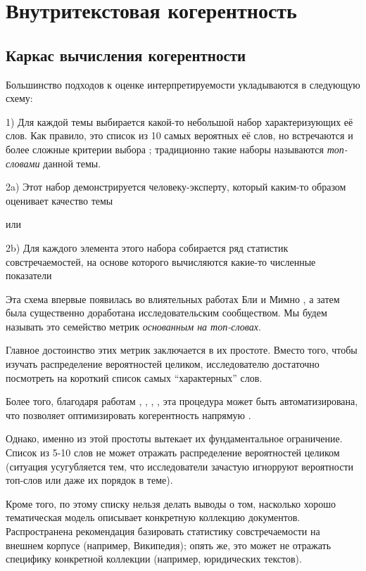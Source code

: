 \chapter{Внутритекстовая когерентность}


\section{Каркас вычисления когерентности}

Большинство подходов к оценке интерпретируемости укладываются в следующую схему:

1) Для каждой темы выбирается какой-то небольшой набор характеризующих её слов. Как правило, это список из 10 самых вероятных её слов, но встречаются и более сложные критерии выбора \cite{blei2009topic}\cite{ldavis2014}\cite{boydcare}; традиционно такие наборы называются \textit{топ-словами} данной темы.

2a) Этот набор демонстрируется человеку-эксперту, который каким-то образом оценивает качество темы

или

2b) Для каждого элемента этого набора собирается ряд статистик совстречаемостей, на основе которого вычисляются какие-то численные показатели

Эта схема впервые появилась во влиятельных работах Бли \cite{rtl} \cite{mrtl} и Мимно \cite{mimno2011}, а затем была существенно доработана исследовательским сообществом. Мы будем называть это семейство метрик \textit{основанным на топ-словах}. 

Главное достоинство этих метрик заключается в их простоте. Вместо того, чтобы изучать распределение вероятностей целиком, исследователю достаточно посмотреть на короткий список самых ``характерных'' слов.

Более того, благодаря работам \cite{mrtl}, \cite{mimno2011}, \cite{aletras2013evaluating}, \cite{roder2015exploring}, эта процедура может быть автоматизирована, что позволяет оптимизировать когерентность напрямую \cite{4keys}.

Однако, именно из этой простоты вытекает их фундаментальное ограничение. Список из 5-10 слов не может отражать распределение вероятностей целиком (ситуация усугубляется тем, что исследователи зачастую игнорруют вероятности топ-слов или даже их порядок в теме). 

Кроме того, по этому списку нельзя делать выводы о том, насколько хорошо тематическая модель описывает конкретную коллекцию документов. Распространена рекомендация базировать статистику совстречаемости на внешнем корпусе (например, Википедия); опять же, это может не отражать специфику конкретной коллекции (например, юридических текстов).

